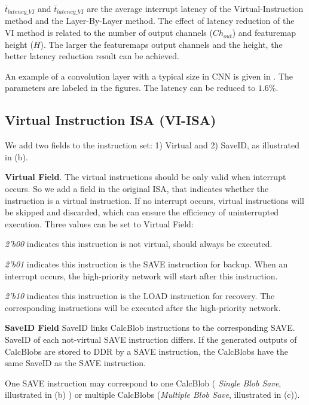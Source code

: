 $\bar{t}_{latency\_VI}$ and $\bar{t}_{latency\_VI}$ are the average interrupt latency of the Virtual-Instruction method and the Layer-By-Layer method. The effect of latency reduction of the VI method is related to the number of output channels ($Ch_{out}$) and featuremap height ($H$). The larger the featuremaps output channels and the height, the better latency reduction result can be achieved.

An example of a convolution layer with a typical size in CNN is given in . The parameters are labeled in the figures. The latency can be reduced to $1.6\%$.



\subsection{Virtual Instruction ISA (VI-ISA) }
\label{sec:virtualinstr}

We add two fields to the instruction set: 1) Virtual and 2) SaveID, as illustrated in (b). 

\textbf{   Virtual Field}. The virtual instructions should be only valid when interrupt occurs. So we add a field in the original ISA, that indicates whether the instruction is a virtual instruction. If no interrupt occurs, virtual instructions will be skipped and discarded, which can ensure the efficiency of uninterrupted execution. Three values can be set to Virtual Field:

	\textit{2'b00} indicates this instruction is not virtual, should always be executed.
	
	\textit{2'b01} indicates this instruction is the SAVE instruction for backup. When an interrupt occurs, the high-priority network will start after this instruction.
	
	\textit{2'b10} indicates this instruction is the LOAD instruction for recovery. The corresponding instructions will be executed after the high-priority network.

\textbf{ SaveID Field }
SaveID links CalcBlob instructions to the corresponding SAVE. SaveID of each not-virtual SAVE instruction differs. If the generated outputs of CalcBlobs are stored to DDR by a SAVE instruction, the CalcBlobs have the same SaveID as the SAVE instruction.

One SAVE instruction may correspond to one CalcBlob ( \textit{Single Blob Save}, illustrated in (b) ) or multiple CalcBlobs (\textit{Multiple Blob Save}, illustrated in (c)).

